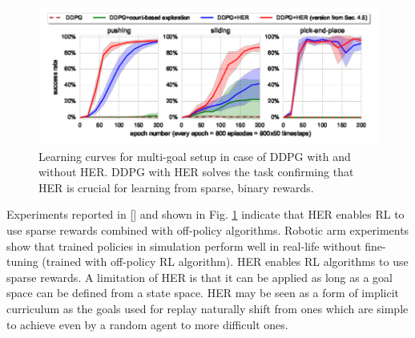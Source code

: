\documentclass[conference]{IEEEtran}
\begin{document}
\begin{figure}[ht]
\centering
\includegraphics[width=0.9\columnwidth]{img/HER_robotic_experiments.png}
\caption{Learning curves for multi-goal setup in case of DDPG with and without HER. DDPG with HER solves the task confirming that HER is crucial for learning from sparse, binary rewards.}
\label{fig:her_robot_experiment}
\end{figure}
Experiments reported in [\cite{andrychowicz2017hindsight}] and shown in Fig. \ref{fig:her_robot_experiment} indicate that HER enables RL to use sparse rewards combined with off-policy algorithms. Robotic arm experiments show that trained policies in simulation perform well in real-life without fine-tuning (trained with off-policy RL algorithm).
HER enables RL algorithms to use sparse rewards. A limitation of HER is that it can be applied as long as a goal space can be defined from a state space. HER may be seen as a form of implicit curriculum as the goals used for replay naturally shift from ones which are simple to achieve even by a random agent to more difficult ones.
\end{document}
